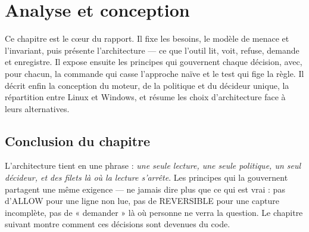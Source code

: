 \chapter{Analyse et conception}
\label{ch:conception}

Ce chapitre est le c\oe ur du rapport. Il fixe les besoins, le modèle de menace et
l'invariant, puis présente l'architecture --- ce que l'outil lit, voit, refuse, demande et
enregistre. Il expose ensuite les principes qui gouvernent chaque décision, avec, pour
chacun, la commande qui casse l'approche naïve et le test qui fige la règle. Il décrit
enfin la conception du moteur, de la politique et du décideur unique, la répartition entre
Linux et Windows, et résume les choix d'architecture face à leurs alternatives.










\section*{Conclusion du chapitre}
L'architecture tient en une phrase : \emph{une seule lecture, une seule politique, un seul
décideur, et des filets là où la lecture s'arrête}. Les principes qui la gouvernent
partagent une même exigence --- ne jamais dire plus que ce qui est vrai : pas d'ALLOW pour
une ligne non lue, pas de REVERSIBLE pour une capture incomplète, pas de « demander » là où
personne ne verra la question. Le chapitre suivant montre comment ces décisions sont
devenues du code.
